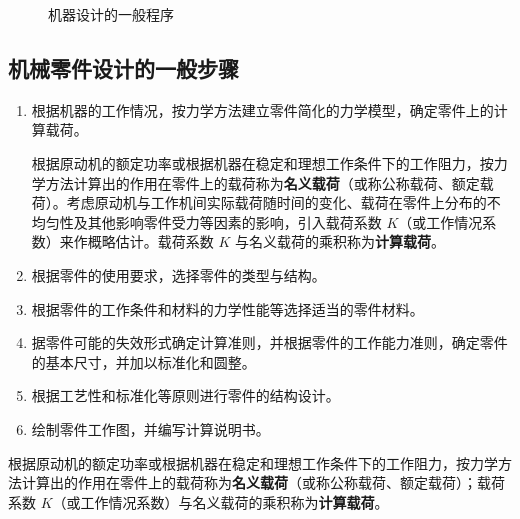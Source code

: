 \begin{figure}[H]
\caption{机器设计的一般程序}
\label{fig:机器设计一般程序}
\end{figure}

\subsection{机械零件设计的一般步骤}

\begin{enumerate}
	\item 根据机器的工作情况，按力学方法建立零件简化的力学模型，确定零件上的计算载荷。

	根据原动机的额定功率或根据机器在稳定和理想工作条件下的工作阻力，按力学方法计算出的作用在零件上的载荷称为\textbf{名义载荷}（或称公称载荷、额定载荷）。考虑原动机与工作机间实际载荷随时间的变化、载荷在零件上分布的不均匀性及其他影响零件受力等因素的影响，引入载荷系数 $K$（或工作情况系数）来作概略估计。载荷系数 $K$ 与名义载荷的乘积称为\textbf{计算载荷}。

	\item 根据零件的使用要求，选择零件的类型与结构。

	\item 根据零件的工作条件和材料的力学性能等选择适当的零件材料。

	\item 据零件可能的失效形式确定计算准则，并根据零件的工作能力准则，确定零件的基本尺寸，并加以标准化和圆整。

	\item 根据工艺性和标准化等原则进行零件的结构设计。

	\item 绘制零件工作图，并编写计算说明书。
\end{enumerate}

\begin{definition}[名义载荷与计算载荷]
\label{def:名义载荷与计算载荷}
根据原动机的额定功率或根据机器在稳定和理想工作条件下的工作阻力，按力学方法计算出的作用在零件上的载荷称为\textbf{名义载荷}（或称公称载荷、额定载荷）；载荷系数 $K$（或工作情况系数）与名义载荷的乘积称为\textbf{计算载荷}。
\end{definition}

